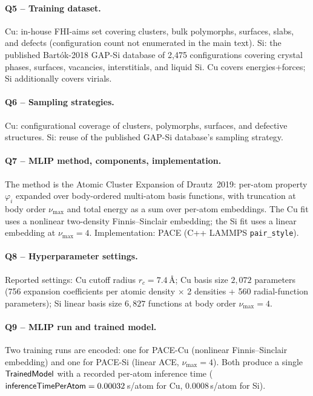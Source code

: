 \paragraph{Q5 -- Training dataset.}
Cu: in-house FHI-aims set covering clusters, bulk polymorphs,
surfaces, slabs, and defects (configuration count not enumerated in
the main text). Si: the published Bart\'ok-2018 GAP-Si database of
2{,}475 configurations covering crystal phases, surfaces, vacancies,
interstitials, and liquid Si. Cu covers energies+forces; Si
additionally covers virials.


\paragraph{Q6 -- Sampling strategies.}
Cu: configurational coverage of clusters, polymorphs, surfaces, and
defective structures. Si: reuse of the published GAP-Si database's
sampling strategy.


\paragraph{Q7 -- MLIP method, components, implementation.}
The method is the Atomic Cluster Expansion of Drautz~2019: per-atom
property $\varphi_i$ expanded over body-ordered multi-atom basis
functions, with truncation at body order $\nu_{\max}$ and total
energy as a sum over per-atom embeddings. The Cu fit uses a
nonlinear two-density Finnis--Sinclair embedding; the Si fit uses
a linear embedding at $\nu_{\max}=4$. Implementation: PACE
(C++ LAMMPS \texttt{pair\_style}).


\paragraph{Q8 -- Hyperparameter settings.}
Reported settings: Cu cutoff radius $r_c = 7.4$\,\AA; Cu basis size
$2{,}072$ parameters (756 expansion coefficients per atomic density
$\times$ 2 densities + 560 radial-function parameters); Si linear
basis size $6{,}827$ functions at body order $\nu_{\max}=4$.


\paragraph{Q9 -- MLIP run and trained model.}
Two training runs are encoded: one for PACE-Cu (nonlinear
Finnis--Sinclair embedding) and one for PACE-Si (linear ACE,
$\nu_{\max}=4$). Both produce a single $\mathsf{TrainedModel}$ with a
recorded per-atom inference time
($\mathsf{inferenceTimePerAtom}=0.00032$\,s/atom for Cu,
$0.0008$\,s/atom for Si).


